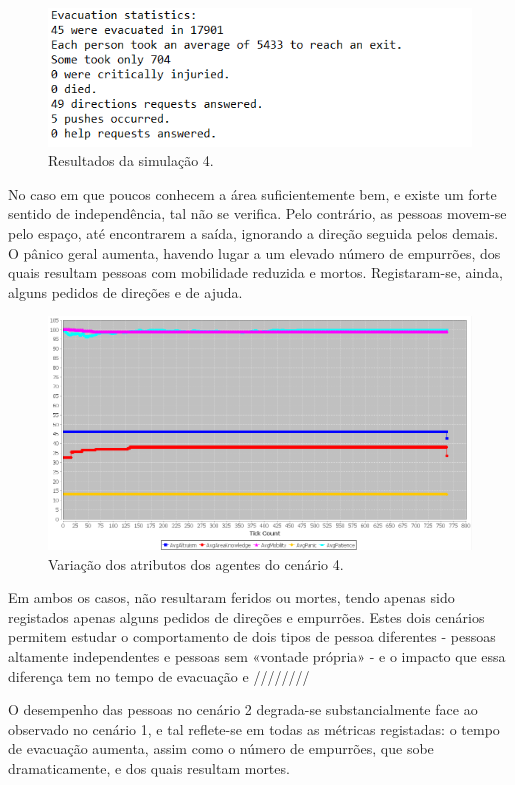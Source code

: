 \documentclass[12pt]{article}
\begin{document}
\begin{titlepage}
\begin{itemize}
\begin{figure}[H]
	\centering
	\includegraphics{log_sc_dependent.png}
	\caption{Resultados da simulação 4.}
	\label{log_sc1}
\end{figure}

No caso em que poucos conhecem a área suficientemente bem, e existe um forte sentido de independência, tal não se verifica. Pelo contrário, as pessoas movem-se pelo espaço, até encontrarem a saída, ignorando a direção seguida pelos demais. O pânico geral aumenta, havendo lugar a um elevado número de empurrões, dos quais resultam pessoas com mobilidade reduzida e mortos. Registaram-se, ainda, alguns pedidos de direções e de ajuda.

\begin{figure}[H]
	\centering
	\includegraphics{graph_sc_dependent.png}
	\caption{Variação dos atributos dos agentes do cenário 4.}
	\label{graph_sc1}
\end{figure}

Em ambos os casos, não resultaram feridos ou mortes, tendo apenas sido registados apenas alguns pedidos de direções e empurrões.
Estes dois cenários permitem estudar o comportamento de dois tipos de pessoa diferentes - pessoas altamente independentes e pessoas sem «vontade própria» - e o impacto que essa diferença tem no tempo de evacuação e ////////

O desempenho das pessoas no cenário 2 degrada-se substancialmente face ao observado no cenário 1, e tal reflete-se em todas as métricas registadas: o tempo de evacuação aumenta, assim como o número de empurrões, que sobe dramaticamente, e dos quais resultam mortes.


\end{itemize}
\end{titlepage}
\end{document}
